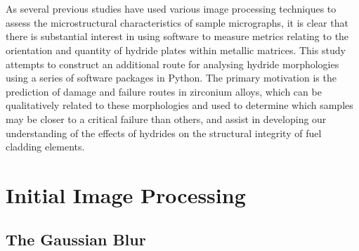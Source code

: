 \documentclass{article}
\begin{document}
    \\
    \\
    As several previous studies have used various image processing techniques to assess the microstructural characteristics of sample micrographs, it is clear that there is substantial interest in using software to measure metrics relating to the orientation and quantity of hydride plates within metallic matrices. This study attempts to construct an additional route for analysing hydride morphologies using a series of software packages in Python. The primary motivation is the prediction of damage and failure routes in zirconium alloys, which can be qualitatively related to these morphologies and used to determine which samples may be closer to a critical failure than others, and assist in developing our understanding of the effects of hydrides on the structural integrity of fuel cladding elements.
	\\
	\section{Initial Image Processing}
	\subsection{The Gaussian Blur}
\end{document}
